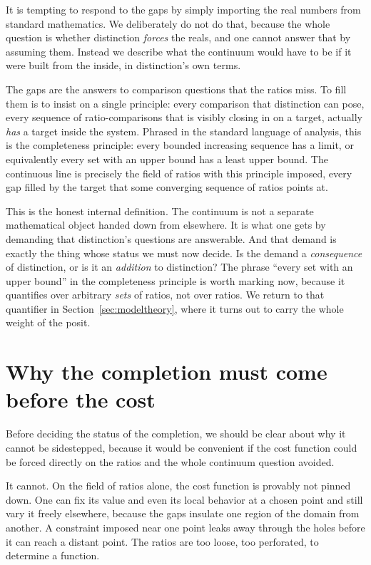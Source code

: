 \documentclass[11pt,a4paper]{article}
\theoremstyle{definition}
\theoremstyle{remark}
\begin{document}
It is tempting to respond to the gaps by simply importing the real numbers from
standard mathematics. We deliberately do not do that, because the whole question
is whether distinction \emph{forces} the reals, and one cannot answer that by
assuming them. Instead we describe what the continuum would have to be if it were
built from the inside, in distinction's own terms.

The gaps are the answers to comparison questions that the ratios miss. To fill
them is to insist on a single principle: every comparison that distinction can
pose, every sequence of ratio-comparisons that is visibly closing in on a target,
actually \emph{has} a target inside the system. Phrased in the standard language
of analysis, this is the completeness principle: every bounded increasing
sequence has a limit, or equivalently every set with an upper bound has a least
upper bound. The continuous line is precisely the field of ratios with this
principle imposed, every gap filled by the target that some converging sequence of
ratios points at.

This is the honest internal definition. The continuum is not a separate
mathematical object handed down from elsewhere. It is what one gets by demanding
that distinction's questions are answerable. And that demand is exactly the thing
whose status we must now decide. Is the demand a \emph{consequence} of
distinction, or is it an \emph{addition} to distinction? The phrase ``every set
with an upper bound'' in the completeness principle is worth marking now, because
it quantifies over arbitrary \emph{sets} of ratios, not over ratios. We return to
that quantifier in Section~\ref{sec:modeltheory}, where it turns out to carry the
whole weight of the posit.

\section{Why the completion must come before the cost}

Before deciding the status of the completion, we should be clear about why it
cannot be sidestepped, because it would be convenient if the cost function could
be forced directly on the ratios and the whole continuum question avoided.

It cannot. On the field of ratios alone, the cost function is provably not
pinned down. One can fix its value and even its local behavior at a chosen point
and still vary it freely elsewhere, because the gaps insulate one region of the
domain from another. A constraint imposed near one point leaks away through the
holes before it can reach a distant point. The ratios are too loose, too
perforated, to determine a function.
\end{document}
